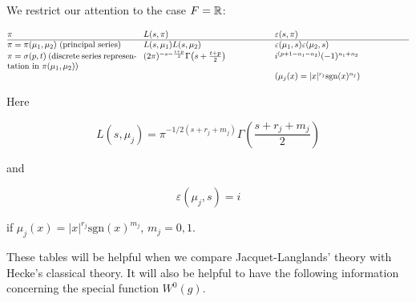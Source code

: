 \begin{theorem}\label{thm:6.16}

We restrict our attention to the case $F = \mathbb{R}$:

{\small

\[
\begin{array}{@{}p{5.4cm}@{\hspace{0.8em}}p{5.2cm}@{\hspace{0.8em}}p{5.6cm}@{}}
$\pi$ & $L(s, \pi)$ & $\varepsilon(s, \pi)$\\ \hline
$\pi = \pi(\mu_1, \mu_2)$ (principal series) & $L(s, \mu_1)L(s, \mu_2)$ & $\varepsilon(\mu_1, s)\varepsilon(\mu_2, s)$\\
$\pi = \sigma(p, t)$ (discrete series representation in $\pi(\mu_1, \mu_2)$) & $(2\pi)^{-s-\frac{t+p}{2}}\Gamma\!\left(s+\frac{t+p}{2}\right)$ & $i^{(p+1-n_1-n_2)}(-1)^{n_1+n_2}$\\[0.2em]
& & $(\mu_j(x) = |x|^{r_j}\mathrm{sgn}(x)^{n_j})$
\end{array}
\]

}

\end{theorem}

Here

\begin{equation}\label{eq:6.39}
L(s, \mu_j) = \pi^{-1/2(s + r_j + m_j)} \Gamma\!\left(\frac{s + r_j + m_j}{2}\right)\tag{6.39}
\end{equation}

and

\begin{equation}\label{eq:6.40}
\varepsilon(\mu_j, s) = i\tag{6.40}
\end{equation}

if $\mu_j(x) = |x|^{r_j}\mathrm{sgn}(x)^{m_j}$, $m_j = 0, 1$.

These tables will be helpful when we compare Jacquet-Langlands' theory with Hecke's classical theory. It will also be helpful to have the following information concerning the special function $W^0(g)$.

